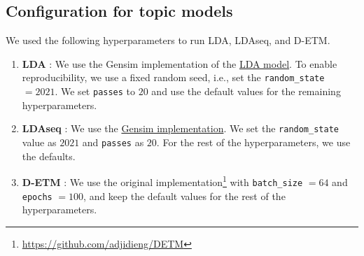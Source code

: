 \documentclass[10pt, a4paper]{article}
\begin{document}
 \subsection{Configuration for topic models}
 \label{ap:tm}
 We used the following hyperparameters to run LDA, LDAseq, and D-ETM. 
  \begin{enumerate}
      \item \textbf{LDA} \cite{blei2003latent}: We use the Gensim implementation of the \href{https://radimrehurek.com/gensim/models/ldamodel.html}{LDA model}. To enable reproducibility, we use a fixed random seed, i.e., set the \texttt{random\_state} $=2021$. We set \texttt{passes} to $20$ and use the default values for the remaining hyperparameters.
      \item \textbf{LDAseq} \cite{blei2006dynamic}: We use the \href{https://radimrehurek.com/gensim/models/ldaseqmodel.html}{Gensim implementation}. We set the \texttt{random\_state} value as $2021$ and \texttt{passes} as $20$. For the rest of the  hyperparameters, we use the defaults.
      \item \textbf{D-ETM} \cite{DETM}: We use the original  implementation\footnote{ \url{https://github.com/adjidieng/DETM}} with \texttt{batch\_size} $=64$ and \texttt{epochs} $=100$, and keep the default values for the rest of the hyperparameters.
  \end{enumerate}
\end{document}
